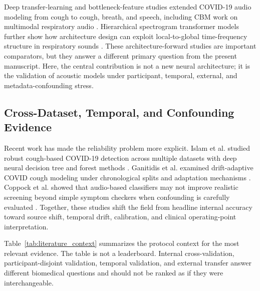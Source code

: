 \documentclass[preprint,12pt]{elsarticle}
\begin{document}
Deep transfer-learning and bottleneck-feature studies extended COVID-19 audio modeling from cough to cough, breath, and speech, including CBM work on multimodal respiratory audio \citep{pahar2022transfer}. Hierarchical spectrogram transformer models further show how architecture design can exploit local-to-global time-frequency structure in respiratory sounds \citep{aytekin2024hst}. These architecture-forward studies are important comparators, but they answer a different primary question from the present manuscript. Here, the central contribution is not a new neural architecture; it is the validation of acoustic models under participant, temporal, external, and metadata-confounding stress.

\subsection{Cross-Dataset, Temporal, and Confounding Evidence}

Recent work has made the reliability problem more explicit. Islam et al. studied robust cough-based COVID-19 detection across multiple datasets with deep neural decision tree and forest methods \citep{islam2026eswa}. Ganitidis et al. examined drift-adaptive COVID cough modeling under chronological splits and adaptation mechanisms \citep{ganitidis2025jmir}. Coppock et al. showed that audio-based classifiers may not improve realistic screening beyond simple symptom checkers when confounding is carefully evaluated \citep{coppock2024nmi}. Together, these studies shift the field from headline internal accuracy toward source shift, temporal drift, calibration, and clinical operating-point interpretation.

Table~\ref{tab:literature_context} summarizes the protocol context for the most relevant evidence. The table is not a leaderboard. Internal cross-validation, participant-disjoint validation, temporal validation, and external transfer answer different biomedical questions and should not be ranked as if they were interchangeable.
\end{document}
